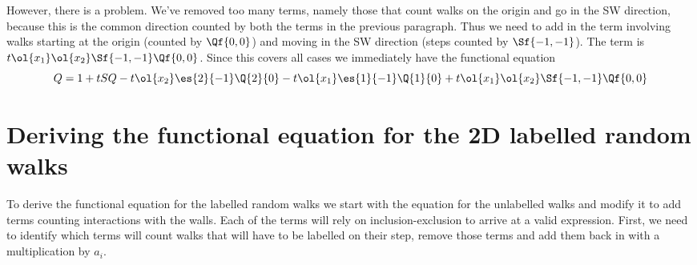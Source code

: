 However, there is a problem. We've removed too many terms, namely those that count walks on the origin and go in the SW direction, because this is the common direction counted by both the terms in the previous paragraph. Thus we need to add in the term involving walks starting at the origin (counted by $\Qf{0,0}$) and moving in the SW direction (steps counted by $\Sf{-1,-1}$). The term is $t\ol{x_1}\ol{x_2}\Sf{-1,-1}\Qf{0,0}$. Since this covers all cases we immediately have the functional equation
\[
Q = 1 + tSQ - t \ol{x_2}\es{2}{-1}\Q{2}{0} - t\ol{x_1}\es{1}{-1}\Q{1}{0}+t\ol{x_1}\ol{x_2}\Sf{-1,-1}\Qf{0,0}
\]

\section{Deriving the functional equation for the 2D labelled random walks}

To derive the functional equation for the labelled random walks we start with the equation for the unlabelled walks and modify it to add terms counting interactions with the walls. Each of the terms will rely on inclusion-exclusion to arrive at a valid expression. First, we need to identify which terms will count walks that will have to be labelled on their step, remove those terms and add them back in with a multiplication by $a_i$.

